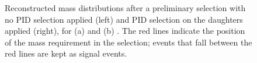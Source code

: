 \begin{figure}
\hfill
{}
\caption{Reconstructed \Dz mass distributions after a preliminary selection with no PID selection applied (left) and PID selection on the \Dz daughters applied (right), for (a) \kk and (b) \pipi. The red lines indicate the position of the \Dz mass requirement in the selection; events that fall between the red lines are kept as signal events.}
\label{fig:crossfeed}
\end{figure}

